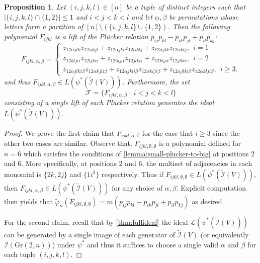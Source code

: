 \documentclass[12pt, reqno]{amsart}
\numberwithin{equation}{section}
\theoremstyle{plain}
\newtheorem{proposition}[theorem]{Proposition}
\theoremstyle{definition}
\newcommand{\ci}{\mathcal{I}}
\begin{document}
\begin{proposition}
\label{prop:plucker-lifts}
Let $(i,j,k,l) \in [n]$ be a tuple of distinct integers such that $|\{i,j,k,l\} \cap\{1, 2\}| \leq 1$ and $i < j <k < l$ and let $\alpha, \beta$ be permutations whose letters form a partition of $[n] \setminus (\{i,j,k,l\} \cup \{1, 2\})$. Then the following polynomial $F_{ijkl}$ is a lift of the Pl\"ucker relation $p_{ij}p_{kl} - p_{ik}p_{jl} + p_{il}p_{kj}$:
\[
F_{ijkl, \alpha, \beta} = \begin{cases}
z_{12\alpha jlk}z_{12\alpha kjl} + 
z_{12\alpha jkl}z_{12\alpha klj} +
z_{12\alpha jlk}z_{12\alpha klj}, ~~ i = 1 \\
z_{12 klj \alpha}z_{12 ljk \alpha} + 
z_{12 lkj \alpha}z_{12 jlk \alpha} +
z_{12 klj \alpha}z_{12 jlk \alpha}, ~~ i = 2 \\
z_{12\alpha jlki \beta}z_{12\alpha kjli \beta} + 
z_{12\alpha jkli \beta}z_{12\alpha klji \beta} +
z_{12\alpha jlki \beta}z_{12\alpha klji \beta}, ~~ i \geq 3.
\end{cases}
\]
and thus $F_{ijkl, \alpha, \beta} \in L(\psi^\ast(\tilde{\ci}(V)))$. Furthermore, the set
\[
\mathcal{F} = \{F_{ijkl, \alpha, \beta} ~:~ i < j <k < l\}
\]
consisting of a single lift of each Pl\"ucker relation generates the ideal $L(\psi^\ast(\tilde{\ci}(V)))$. 
\end{proposition}
\begin{proof}
We prove the first claim that $F_{ijkl, \alpha, \beta}$ for the case that $i \geq 3$ since the other two cases are similar. Observe that, $F_{ijkl, \emptyset, \emptyset}$ is a polynomial defined for $n = 6$ which satisfies the conditions of \cref{lemma:small-plucker-to-big} at positions $2$ and $6$. More specifically, at 
positions $2$ and $6$, the multiset of adjacencies in each monomial is $\{2k, 2j\}$ and $\{1i^2\}$ respectively. Thus if $F_{ijkl, \emptyset, \emptyset} \in L(\psi^\ast(\tilde{\ci}(V)))$, then $F_{ijkl, \alpha, \beta} \in L(\psi^\ast(\tilde{\ci}(V)))$ for any choice of $\alpha, \beta$. Explicit computation then yields that $\tilde{\varphi}_n(F_{ijkl, \emptyset, \emptyset}) = m(p_{ij}p_{kl} - p_{ik}p_{jl} + p_{il}p_{kj})$ as desired. 

For the second claim, recall that by \cref{thm:fullideal} the ideal $\mathcal{L}(\psi^\ast(\tilde{\ci}(V)))$ can be generated by a single image of each generator of $\tilde{\ci}(V)$ (or equivalently $\ci(\mathrm{Gr}(2,n))$) under $\psi^\ast$ and thus it suffices to choose a single valid $\alpha$ and $\beta$ for each tuple $(i,j,k,l)$. 
\end{proof}
\end{document}
